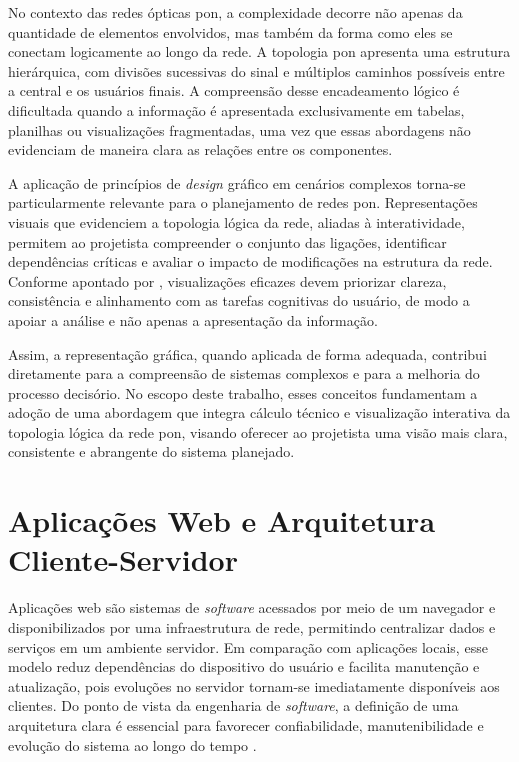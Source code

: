 No contexto das redes ópticas \gls{pon}, a complexidade decorre não apenas da quantidade de elementos envolvidos, mas também da forma como eles se conectam logicamente ao longo da rede. A topologia \gls{pon} apresenta uma estrutura hierárquica, com divisões sucessivas do sinal e múltiplos caminhos possíveis entre a central e os usuários finais. A compreensão desse encadeamento lógico é dificultada quando a informação é apresentada exclusivamente em tabelas, planilhas ou visualizações fragmentadas, uma vez que essas abordagens não evidenciam de maneira clara as relações entre os componentes.

A aplicação de princípios de \textit{design} gráfico em cenários complexos torna-se particularmente relevante para o planejamento de redes \gls{pon}. Representações visuais que evidenciem a topologia lógica da rede, aliadas à interatividade, permitem ao projetista compreender o conjunto das ligações, identificar dependências críticas e avaliar o impacto de modificações na estrutura da rede. Conforme apontado por , visualizações eficazes devem priorizar clareza, consistência e alinhamento com as tarefas cognitivas do usuário, de modo a apoiar a análise e não apenas a apresentação da informação.

Assim, a representação gráfica, quando aplicada de forma adequada, contribui diretamente para a compreensão de sistemas complexos e para a melhoria do processo decisório. No escopo deste trabalho, esses conceitos fundamentam a adoção de uma abordagem que integra cálculo técnico e visualização interativa da topologia lógica da rede \gls{pon}, visando oferecer ao projetista uma visão mais clara, consistente e abrangente do sistema planejado.

\section{Aplicações Web e Arquitetura Cliente-Servidor}
 
Aplicações web são sistemas de \textit{software} acessados por meio de um navegador e disponibilizados por uma infraestrutura de rede, permitindo centralizar dados e serviços em um ambiente servidor. Em comparação com aplicações locais, esse modelo reduz dependências do dispositivo do usuário e facilita manutenção e atualização, pois evoluções no servidor tornam-se imediatamente disponíveis aos clientes. Do ponto de vista da engenharia de \textit{software}, a definição de uma arquitetura clara é essencial para favorecer confiabilidade, manutenibilidade e evolução do sistema ao longo do tempo \cite{pressman2014software,sommerville2016software}.

